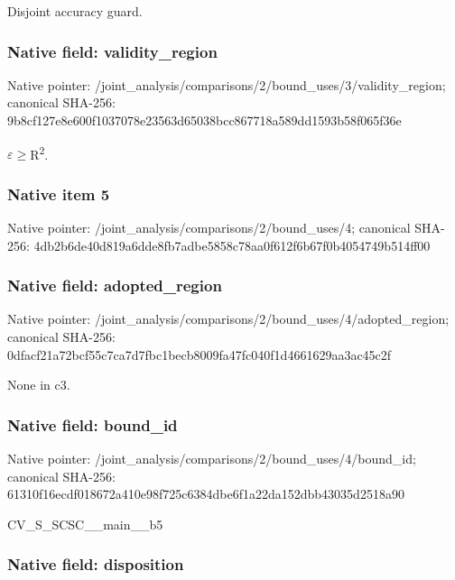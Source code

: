 \documentclass[10pt,a4paper]{article}
\begin{document}
Disjoint accuracy guard.


\subsubsection{Native field: validity\_region}


Native pointer: /joint\_analysis/comparis\allowbreak{}ons/2/bound\_uses/3/valid\allowbreak{}ity\_region; canonical SHA-256: 9b8cf127e8e600f1037078e2\allowbreak{}3563d65038bcc867718a589d\allowbreak{}d1593b58f065f36e


\ensuremath{\varepsilon}\ensuremath{\ge}R\textsuperscript{2}.


\subsubsection{Native item 5}


Native pointer: /joint\_analysis/comparis\allowbreak{}ons/2/bound\_uses/4; canonical SHA-256: 4db2b6de40d819a6dde8fb7a\allowbreak{}dbe5858c78aa0f612f6b67f0\allowbreak{}b4054749b514ff00



\subsubsection{Native field: adopted\_region}


Native pointer: /joint\_analysis/comparis\allowbreak{}ons/2/bound\_uses/4/adopt\allowbreak{}ed\_region; canonical SHA-256: 0dfacf21a72bcf55c7ca7d7f\allowbreak{}bc1becb8009fa47fc040f1d4\allowbreak{}661629aa3ac45c2f


None in c3.


\subsubsection{Native field: bound\_id}


Native pointer: /joint\_analysis/comparis\allowbreak{}ons/2/bound\_uses/4/bound\allowbreak{}\_id; canonical SHA-256: 61310f16ecdf018672a410e9\allowbreak{}8f725c6384dbe6f1a22da152\allowbreak{}dbb43035d2518a90


CV\_S\_SCSC\_\_main\_\_b5


\subsubsection{Native field: disposition}
\end{document}
